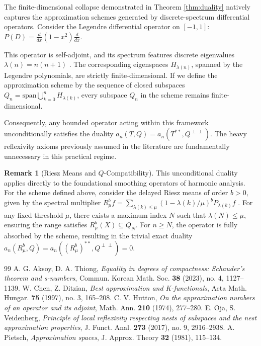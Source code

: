 \documentclass[11pt,reqno]{amsart}
\theoremstyle{definition}
\newtheorem{remark}[theorem]{Remark}
\begin{document}
The finite-dimensional collapse demonstrated in Theorem \ref{thm:duality} natively captures the approximation schemes generated by discrete-spectrum differential operators. Consider the Legendre differential operator on $[-1, 1]$: $P(D) = \frac{d}{dx}(1-x^2)\frac{d}{dx}$. 

This operator is self-adjoint, and its spectrum features discrete eigenvalues $\lambda(n) = n(n+1)$ \cite{Chen1997}. The corresponding eigenspaces $H_{\lambda(n)}$, spanned by the Legendre polynomials, are strictly finite-dimensional. If we define the approximation scheme by the sequence of closed subspaces $Q_n = \mathrm{span} \bigcup_{k=0}^n H_{\lambda(k)}$, every subspace $Q_n$ in the scheme remains finite-dimensional. 

Consequently, any bounded operator acting within this framework unconditionally satisfies the duality $a_n(T, Q) = a_n(T^{**}, Q^{\perp\perp})$. The heavy reflexivity axioms previously assumed in the literature are fundamentally unnecessary in this practical regime.

\begin{remark}[Riesz Means and $Q$-Compatibility]
This unconditional duality applies directly to the foundational smoothing operators of harmonic analysis. For the scheme defined above, consider the delayed Riesz means of order $b > 0$, given by the spectral multiplier $R_\mu^b f = \sum_{\lambda(k) \le \mu} (1 - \lambda(k)/\mu)^b P_{\lambda(k)}f$ \cite{Chen1997}. For any fixed threshold $\mu$, there exists a maximum index $N$ such that $\lambda(N) \le \mu$, ensuring the range satisfies $R_\mu^b(X) \subseteq Q_N$. For $n \ge N$, the operator is fully absorbed by the scheme, resulting in the trivial exact duality $a_n(R_\mu^b, Q) = a_n((R_\mu^b)^{**}, Q^{\perp\perp}) = 0$.
\end{remark}

\begin{thebibliography}{99}
 A. G. Aksoy, D. A. Thiong, \emph{Equality in degrees of compactness: Schauder's theorem and s-numbers}, Commun. Korean Math. Soc. \textbf{38} (2023), no. 4, 1127--1139.
 W. Chen, Z. Ditzian, \emph{Best approximation and K-functionals}, Acta Math. Hungar. \textbf{75} (1997), no. 3, 165--208.
 C. V. Hutton, \emph{On the approximation numbers of an operator and its adjoint}, Math. Ann. \textbf{210} (1974), 277--280.
 E. Oja, S. Veidenberg, \emph{Principle of local reflexivity respecting nests of subspaces and the nest approximation properties}, J. Funct. Anal. \textbf{273} (2017), no. 9, 2916--2938.
 A. Pietsch, \emph{Approximation spaces}, J. Approx. Theory \textbf{32} (1981), 115--134.
\end{thebibliography}
\end{document}
